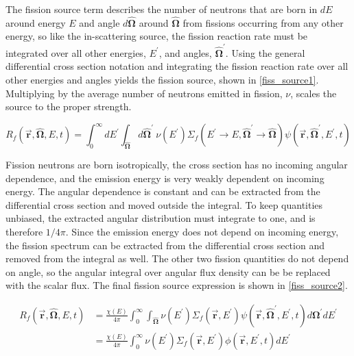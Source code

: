 The fission source term describes the number of neutrons that are born in $dE$ around energy $E$ and angle $d\boldsymbol{\hat{\Omega}}$ around $\boldsymbol{\hat{\Omega}}$ from fissions occurring from any other energy, so like the in-scattering source, the fission reaction rate must be integrated over all other energies, $E^\prime$, and angles, $\boldsymbol{\hat{\Omega}}^\prime$.  Using the general differential cross section notation and integrating the fission reaction rate over all other energies and angles yields the fission source, shown in \eqref{fiss_source1}. Multiplying by the average number of neutrons emitted in fission, $\nu$, scales the source to the proper strength.  

\begin{equation}
\label{fiss_source1}
R_f(\boldsymbol{\vec{r}},\boldsymbol{\hat{\Omega}},E,t) =  \int_0^\infty dE^\prime \int_{\boldsymbol{\hat{\Omega}}} d\boldsymbol{\hat{\Omega}}^\prime \: \nu(E^\prime) \Sigma_f(E^\prime \rightarrow E,\boldsymbol{\hat{\Omega}}^\prime \rightarrow \boldsymbol{\hat{\Omega}}) \psi(\boldsymbol{\vec{r}},\boldsymbol{\hat{\Omega}}^\prime,E^\prime,t)  
 \end{equation}
 
 Fission neutrons are born isotropically, the cross section has no incoming angular dependence, and the emission energy is very weakly dependent on incoming energy.  The angular dependence is constant and can be extracted from the differential cross section and moved outside the integral.  To keep quantities unbiased, the extracted angular distribution must integrate to one, and is therefore $1/4\pi$.  Since the emission energy does not depend on incoming energy, the fission spectrum can be extracted from the differential cross section and removed from the integral as well.  The other two fission quantities do not depend on angle, so the angular integral over angular flux density can be be replaced with the scalar flux.  The final fission source expression is shown in \eqref{fiss_source2}.

\begin{equation}
\label{fiss_source2}
\begin{split}
R_f(\boldsymbol{\vec{r}},\boldsymbol{\hat{\Omega}},E,t) & = \frac{\chi(E)}{4\pi} \int_0^\infty  \int_{\boldsymbol{\hat{\Omega}}}   \nu(E^\prime) \Sigma_f(\boldsymbol{\vec{r}},E^\prime) \psi(\boldsymbol{\vec{r}},\boldsymbol{\hat{\Omega}}^\prime,E^\prime,t) d\boldsymbol{\Omega}^\prime  dE^\prime \\
&= \frac{\chi(E)}{4\pi} \int_0^\infty   \nu(E^\prime) \Sigma_f(\boldsymbol{\vec{r}},E^\prime) \phi(\boldsymbol{\vec{r}},E^\prime,t)  dE^\prime
\end{split}
 \end{equation}


